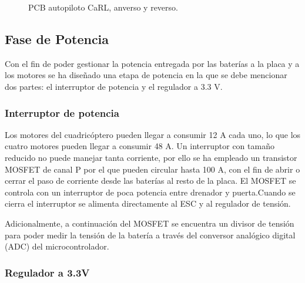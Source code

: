 \begin{figure}[htb!]
\begin{subfigure}{0.49\textwidth}
	\end{subfigure}
	
	\caption{PCB autopiloto CaRL, anverso y reverso.}
	\label{PCB}
	
	
\end{figure}


\subsection{Fase de Potencia}

Con el fin de poder gestionar la potencia entregada por las baterías a la placa y a los motores se ha diseñado una etapa de potencia en la que se debe mencionar dos partes: el interruptor de potencia y el regulador a 3.3 V.

\subsubsection{Interruptor de potencia}

Los motores del cuadricóptero pueden llegar a consumir 12 A cada uno, lo que los cuatro motores pueden llegar a consumir 48 A. Un interruptor con tamaño reducido no puede manejar tanta corriente, por ello se ha empleado un transistor MOSFET de canal P por el que pueden circular hasta 100 A, con el fin de abrir o cerrar el paso de corriente desde las baterías al resto de la placa. El MOSFET se controla con un interruptor de poca potencia entre drenador y puerta.Cuando se cierra el interruptor se alimenta directamente al ESC y al regulador de tensión.

Adicionalmente, a continuación del MOSFET se encuentra un divisor de tensión para poder medir la tensión de la batería a través del conversor analógico digital (ADC) del microcontrolador.   


\subsubsection{Regulador a 3.3V}

